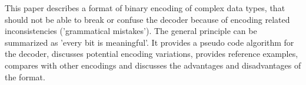 This paper describes a format of binary encoding of complex data types,
that should not be able to
break or confuse the decoder because of encoding related inconsistencies
('grammatical mistakes').
The general principle can be summarized as 'every bit is meaningful'.
It provides a pseudo code algorithm for the decoder,
discusses potential encoding variations, provides reference examples,
compares with other encodings and discusses the advantages
and disadvantages of the format.
